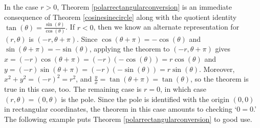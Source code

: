 \smallskip


\smallskip

In the case $r > 0$, Theorem \ref{polarrectangularconversion} is an immediate consequence of Theorem \ref{cosinesinecircle} along with the quotient identity  $\tan(\theta) = \frac{\sin(\theta)}{\cos(\theta)}$. If $r < 0$, then we know an alternate representation for $(r,\theta)$ is $(-r, \theta + \pi)$. Since $\cos(\theta + \pi) = -\cos(\theta)$ and $\sin(\theta + \pi) = -\sin(\theta)$, applying the theorem to $(-r,\theta+\pi)$ gives $x = (-r) \cos(\theta + \pi) = (-r)(-\cos(\theta)) = r\cos(\theta)$ and $y = (-r) \sin(\theta + \pi) = (-r)(-\sin(\theta)) = r\sin(\theta)$.  Moreover, $x^2 + y^2 = (-r)^2 = r^2$, and $\frac{y}{x} = \tan(\theta + \pi) = \tan(\theta)$, so the theorem is true in this case, too.  The remaining case is $r = 0$, in which case $(r,\theta) = (0,\theta)$ is the pole.  Since the pole is identified with the origin $(0,0)$ in rectangular coordinates, the theorem in this case amounts to checking `$0=0$.'  The following example puts Theorem \ref{polarrectangularconversion} to good use.

\medskip

